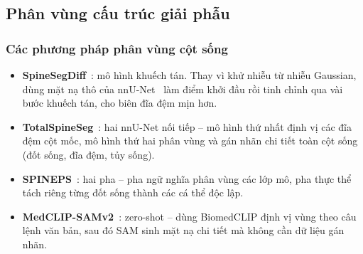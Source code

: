 \documentclass{beamer}
\numberwithin{figure}{section}
\numberwithin{table}{section}
\begin{document}
\subsection{Phân vùng cấu trúc giải phẫu}
\begin{frame}
\frametitle{Các phương pháp phân vùng cột sống}
\begin{itemize}
    \item[--] \textbf{SpineSegDiff}~\cite{monzon2024diffusion}: mô hình khuếch tán. Thay vì khử nhiễu từ nhiễu Gaussian, dùng mặt nạ thô của nnU-Net~\cite{isensee2021nnunet} làm điểm khởi đầu rồi tinh chỉnh qua vài bước khuếch tán, cho biên đĩa đệm mịn hơn.
    \pause
    \item[--] \textbf{TotalSpineSeg}~\cite{warszawer2025totalspineseg}: hai nnU-Net nối tiếp -- mô hình thứ nhất định vị các đĩa đệm cột mốc, mô hình thứ hai phân vùng và gán nhãn chi tiết toàn cột sống (đốt sống, đĩa đệm, tủy sống).
    \pause
    \item[--] \textbf{SPINEPS}~\cite{moller2024spineps}: hai pha -- pha ngữ nghĩa phân vùng các lớp mô, pha thực thể tách riêng từng đốt sống thành các cá thể độc lập.
    \pause
    \item[--] \textbf{MedCLIP-SAMv2}~\cite{koleilat2025medclipsamv2}: zero-shot -- dùng BiomedCLIP định vị vùng theo câu lệnh văn bản, sau đó SAM sinh mặt nạ chi tiết mà không cần dữ liệu gán nhãn.
\end{itemize}
\end{frame}
\end{document}
